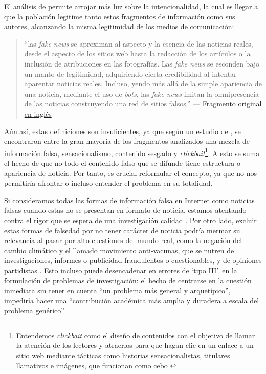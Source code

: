 El análisis de \citet{Tandoc2017} permite arrojar más luz sobre la intencionalidad, la cual es llegar a que la población legitime tanto estos fragmentos de información como sus autores, alcanzando la misma legitimidad de los medios de comunicación:

\label{frag3esp}
\begin{quotation}
    ``las \emph{fake news} se aproximan al aspecto y la esencia de las noticias reales, desde el aspecto de los sitios web hasta la redacción de los artículos o la inclusión de atribuciones en las fotografías. Las \emph{fake news} se esconden bajo un manto de legitimidad, adquiriendo cierta credibilidad al intentar aparentar noticias reales. Incluso, yendo más allá de la simple apariencia de una noticia, mediante el uso de \emph{bots}, las \emph{fake news} imitan la omnipresencia de las noticias construyendo una red de sitios falsos.''  --- \hyperref[frag3eng]{Fragmento original en inglés}
\end{quotation}

Aún así, estas definiciones son insuficientes, ya que según un estudio de \citet{Mourao2019}, se encontraron entre la gran mayoría de los fragmentos analizados una mezcla de información falsa, sensacionalismo, contenido sesgado y \emph{clickbait}\footnote{Entendemos \textit{clickbait} como el diseño de contenidos con el objetivo de llamar la atención de los lectores y atraerlos para que hagan clic en un enlace
a un sitio web mediante tácticas como historias sensacionalistas, titulares llamativos e imágenes, que funcionan
como cebo \citep{Chen2015,Blom2015}}. A esto se suma el hecho de que no todo el contenido falso que se difunde tiene estructura o apariencia de noticia. Por tanto, es crucial reformular el concepto, ya que no nos permitiría afrontar o incluso entender el problema en su totalidad.

Si consideramos todas las formas de información falsa en Internet como noticias falsas cuando estas no se presentan en formato de noticia, estamos atentando contra el rigor que se espera de una investigación calidad \citep{MacKenzie2011,Suddaby2010,Zhang2016}. Por otro lado, excluir estas formas de falsedad por no tener carácter de noticia podría mermar su relevancia al pasar por alto cuestiones del mundo real, como la negación del cambio climático y el llamado movimiento anti-vacunas, que se nutren de investigaciones, informes o publicidad fraudulentos o cuestionables, y de opiniones partidistas \citep{Khan2021}. Esto incluso puede desencadenar en errores de `tipo III'\ en la formulación de problemas de investigación: el hecho de centrarse en la cuestión inmediata sin tener en cuenta ``un problema más general y arquetípico'', impediría hacer una ``contribución académica más amplia y duradera a escala del problema genérico'' \citep{Rai2017}.

